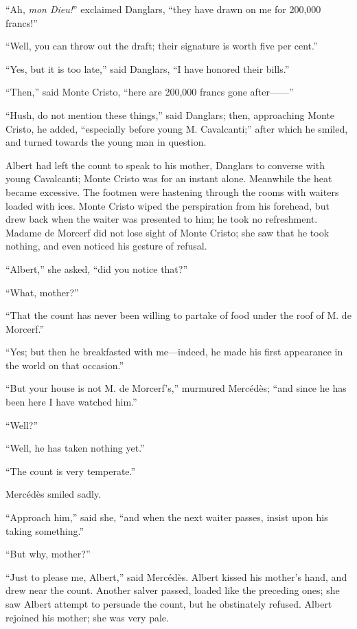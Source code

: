 “Ah, \textit{mon Dieu!}” exclaimed Danglars, “they have drawn on me for
200,000 francs!”

“Well, you can throw out the draft; their signature is worth five per
cent.”

“Yes, but it is too late,” said Danglars, “I have honored their bills.”

“Then,” said Monte Cristo, “here are 200,000 francs gone after——”

“Hush, do not mention these things,” said Danglars; then, approaching
Monte Cristo, he added, “especially before young M. Cavalcanti;” after
which he smiled, and turned towards the young man in question.

Albert had left the count to speak to his mother, Danglars to converse
with young Cavalcanti; Monte Cristo was for an instant alone. Meanwhile
the heat became excessive. The footmen were hastening through the rooms
with waiters loaded with ices. Monte Cristo wiped the perspiration from
his forehead, but drew back when the waiter was presented to him; he
took no refreshment. Madame de Morcerf did not lose sight of Monte
Cristo; she saw that he took nothing, and even noticed his gesture of
refusal.

“Albert,” she asked, “did you notice that?”

“What, mother?”

“That the count has never been willing to partake of food under the
roof of M. de Morcerf.”

“Yes; but then he breakfasted with me—indeed, he made his first
appearance in the world on that occasion.”

“But your house is not M. de Morcerf’s,” murmured Mercédès; “and since
he has been here I have watched him.”

“Well?”

“Well, he has taken nothing yet.”

“The count is very temperate.”

Mercédès smiled sadly.

“Approach him,” said she, “and when the next waiter passes, insist upon
his taking something.”

“But why, mother?”

“Just to please me, Albert,” said Mercédès. Albert kissed his mother’s
hand, and drew near the count. Another salver passed, loaded like the
preceding ones; she saw Albert attempt to persuade the count, but he
obstinately refused. Albert rejoined his mother; she was very pale.

